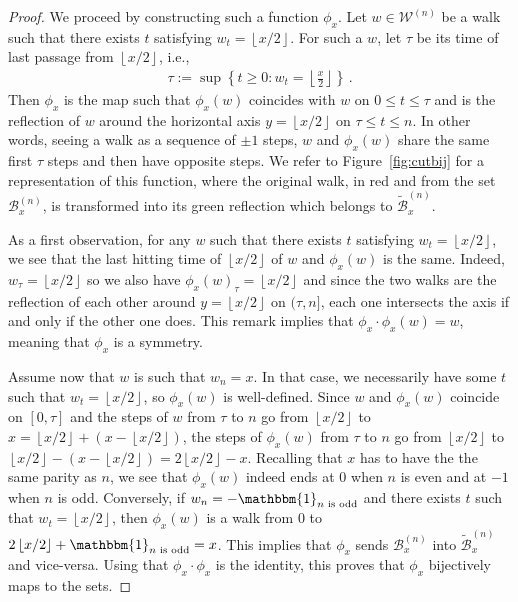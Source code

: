 \documentclass{article}
\newcommand{\1}{\mathbbm{1}}								%
\theoremstyle{definition}
\numberwithin{equation}{section}
\newcommand{\cB}{\mathcal B}
\newcommand{\cW}{\mathcal W}
\newcommand{\floor}[1]{\left\lfloor #1\right\rfloor}
\begin{document}
\begin{proof}
We proceed by constructing such a function $\phi_x$. Let $w\in\cW^{(n)}$ be a walk such that there exists $t$ satisfying $w_t=\floor{x/2}$.
For such a $w$, let $\tau$ be its time of last passage from $\floor{x/2}$, i.e., 
\begin{align*}
    \tau:=\sup\left\{t\geq 0:w_t=\floor{\frac{x}{2}}\right\}\,.
\end{align*}
Then $\phi_x$ is the map such that $\phi_x(w)$ coincides with $w$ on $0 \leq t \leq \tau$ and is the reflection of $w$ around the horizontal axis $y=\floor{x/2}$ on $\tau \leq t \leq n$. In other words, seeing a walk as a sequence of $\pm1$ steps, $w$ and $\phi_x(w)$ share the same first $\tau$ steps and then have opposite steps.
We refer to Figure~\ref{fig:cutbij} for a representation of this function, where the original walk, in red and from the set $\cB^{(n)}_x$, is transformed into its green reflection which belongs to $\tilde{\cB}^{(n)}_x$.

As a first observation, for any $w$ such that there exists $t$ satisfying $w_t=\floor{x/2}$, we see that the last hitting time of $\floor{x/2}$ of $w$ and $\phi_x(w)$ is the same.
Indeed, $w_\tau=\floor{x/2}$ so we also have $\phi_x(w)_\tau=\floor{x/2}$ and since the two walks are the reflection of each other around $y=\floor{x/2}$ on $(\tau,n]$, each one intersects the axis if and only if the other one does.
This remark implies that $\phi_x\cdot\phi_x(w)=w$, meaning that $\phi_x$ is a symmetry.

Assume now that $w$ is such that $w_n=x$.
In that case, we necessarily have some $t$ such that $w_t=\floor{x/2}$, so $\phi_x(w)$ is well-defined.
Since $w$ and $\phi_x(w)$ coincide on $[0,\tau]$ and the steps of $w$ from $\tau$ to $n$ go from $\floor{x/2}$ to $x=\floor{x/2}+(x-\floor{x/2})$, the steps of $\phi_x(w)$ from $\tau$ to $n$ go from $\floor{x/2}$ to $\floor{x/2}-(x-\floor{x/2})=2\floor{x/2}-x$.
Recalling that $x$ has to have the the same parity as $n$, we see that $\phi_x(w)$ indeed ends at $0$ when $n$ is even and at $-1$ when $n$ is odd.
Conversely, if $w_n=-\mathbbm{1}_{\textrm{$n$ is odd}}$ and there exists $t$ such that $w_t=\floor{x/2}$, then $\phi_x(w)$ is a walk from $0$ to $2\floor{x/2}+\mathbbm{1}_{\textrm{$n$ is odd}}=x$.
This implies that $\phi_x$ sends $\cB^{(n)}_x$ into $\tilde{\cB}^{(n)}_x$ and vice-versa.
Using that $\phi_x\cdot\phi_x$ is the identity, this proves that $\phi_x$ bijectively maps to the sets.
\end{proof}
\end{document}
